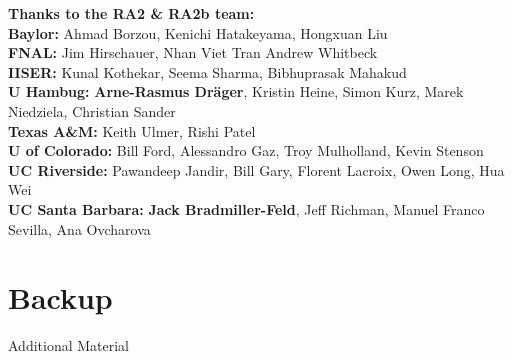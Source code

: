 \documentclass{beamer}
\begin{document}
\begin{frame}
   \begin{center}
    \textbf{\Large Thanks to the RA2 \& RA2b team:}\\\medskip
    \textbf{\large Baylor:} \normalsize Ahmad Borzou, Kenichi Hatakeyama, Hongxuan Liu\\
    \textbf{\large FNAL:} \normalsize Jim Hirschauer, Nhan Viet Tran Andrew Whitbeck\\
    \textbf{\large IISER:} \normalsize Kunal Kothekar, Seema Sharma, Bibhuprasak Mahakud\\
    \textbf{\large U Hambug:} \normalsize \textbf {Arne-Rasmus Dr\"ager}, Kristin Heine, Simon Kurz, Marek Niedziela, Christian Sander\\
    \textbf{\large Texas A\&M:} \normalsize Keith Ulmer, Rishi Patel\\
    \textbf{\large U of Colorado:} \normalsize Bill Ford, Alessandro Gaz, Troy Mulholland, Kevin Stenson\\
    \textbf{\large UC Riverside:} \normalsize Pawandeep Jandir, Bill Gary, Florent Lacroix, Owen Long, Hua Wei\\
    \textbf{\large UC Santa Barbara:} \normalsize \textbf{Jack Bradmiller-Feld}, Jeff Richman, Manuel Franco Sevilla, Ana Ovcharova
    \end{center}
    
\end{frame}

\section{Backup}
\begin{frame}
  \begin{center}
    {\Large Additional Material}
  \end{center}
\end{frame}
\end{document}
